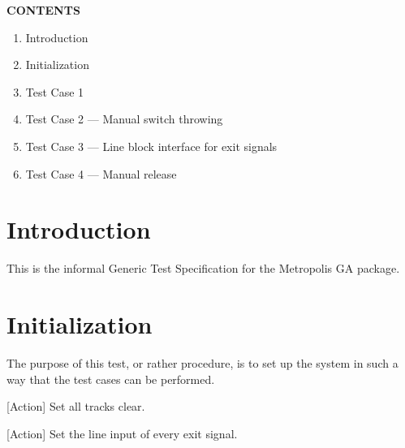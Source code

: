 \documentclass[10pt,a4paper]{article}
\begin{document}
\vspace{4mm}
\begin{tcolorbox}[
  colback=PanelGray,colframe=PanelGray,boxrule=0pt,arc=2mm,
  left=4mm,right=4mm,top=3mm,bottom=2.5mm]
  {\color{Muted}\bfseries\fontsize{7.5}{9}\selectfont CONTENTS\par}
  \vspace{2mm}
  \begin{enumerate}[label=\textcolor{MetroOrange}{\bfseries\arabic*.},
    leftmargin=5mm,labelsep=2mm,itemsep=2.5mm,topsep=0pt,parsep=0pt]
    \item Introduction
    \item Initialization
    \item Test Case 1
    \item Test Case 2 — Manual switch throwing
    \item Test Case 3 — Line block interface for exit signals
    \item Test Case 4 — Manual release
  \end{enumerate}
\end{tcolorbox}

\newpage

\section{Introduction}
This is the informal Generic Test Specification for the Metropolis GA package.

\vspace{9mm}
\section{Initialization}
The purpose of this test, or rather procedure, is to set up the system in such a way that the test cases can be performed.

\begin{procedurebox}
  \begin{teststeps}
    \item \textnormal{[Action]} Set all tracks clear.
    \item \textnormal{[Action]} Set the line input of every exit signal.
  \end{teststeps}
\end{procedurebox}
\end{document}
